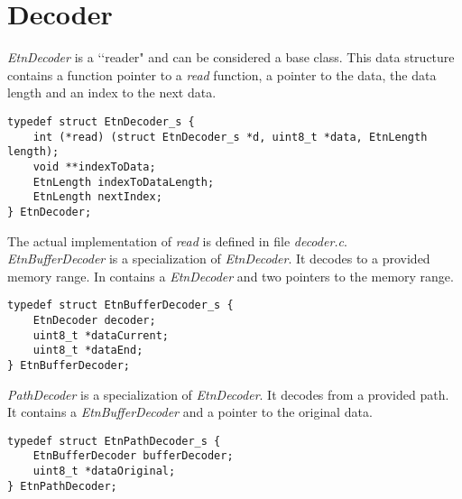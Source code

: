 

\section*{Decoder}
\emph{EtnDecoder} is a \lq\lq reader" and can be considered a base class. This data structure contains a function pointer to a \emph{read} function, a pointer to the data, the data length and an index to the next data.
\begin{lstlisting}
typedef struct EtnDecoder_s {
	int (*read) (struct EtnDecoder_s *d, uint8_t *data, EtnLength length);
	void **indexToData;
	EtnLength indexToDataLength;
	EtnLength nextIndex;
} EtnDecoder;
\end{lstlisting}
The actual implementation of \emph{read} is defined in file \emph{decoder.c}.\\
\emph{EtnBufferDecoder} is a specialization of \emph{EtnDecoder}. It decodes to a provided memory range. In contains a \emph{EtnDecoder} and two pointers to the memory range.
\begin{lstlisting}
typedef struct EtnBufferDecoder_s {
	EtnDecoder decoder;
	uint8_t *dataCurrent;
	uint8_t *dataEnd;
} EtnBufferDecoder;
\end{lstlisting}
\emph{PathDecoder} is a specialization of \emph{EtnDecoder}.
It decodes from a provided path. It contains a \emph{EtnBufferDecoder} and a pointer to the original data.
\begin{lstlisting}
typedef struct EtnPathDecoder_s {
	EtnBufferDecoder bufferDecoder;
	uint8_t *dataOriginal;
} EtnPathDecoder;
\end{lstlisting}
